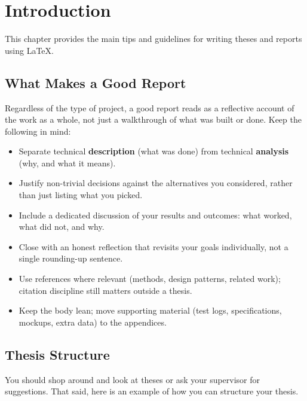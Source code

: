 \chapter{Introduction}
\label{chap:introduction}

This chapter provides the main tips and guidelines for writing theses and reports using \LaTeX.

\section{What Makes a Good Report}
\label{sec:c1:goodreport}

Regardless of the type of project, a good report reads as a reflective account of the work as a whole, not just a walkthrough of what was built or done. Keep the following in mind:

\begin{itemize}
    \item Separate technical \textbf{description} (what was done) from technical \textbf{analysis} (why, and what it means).
    \item Justify non-trivial decisions against the alternatives you considered, rather than just listing what you picked.
    \item Include a dedicated discussion of your results and outcomes: what worked, what did not, and why.
    \item Close with an honest reflection that revisits your goals individually, not a single rounding-up sentence.
    \item Use references where relevant (methods, design patterns, related work); citation discipline still matters outside a thesis.
    \item Keep the body lean; move supporting material (test logs, specifications, mockups, extra data) to the appendices.
\end{itemize}

\section{Thesis Structure}
\label{sec:c1:thesesguidelines}

You should shop around and look at theses or ask your supervisor for suggestions.
That said, here is an example of how you can structure your thesis.

